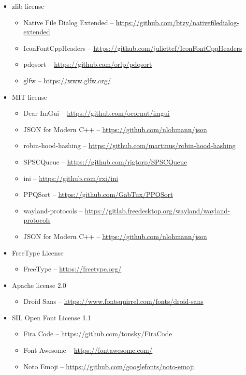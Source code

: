 \documentclass[hidelinks,titlepage,a4paper,twoside]{article}
\begin{document}
\begin{itemize}
\item zlib license
\begin{itemize}
\item Native File Dialog Extended -- \url{https://github.com/btzy/nativefiledialog-extended}
\item IconFontCppHeaders -- \url{https://github.com/juliettef/IconFontCppHeaders}
\item pdqsort -- \url{https://github.com/orlp/pdqsort}
\item glfw -- \url{https://www.glfw.org/}
\end{itemize}

\item MIT license
\begin{itemize}
\item Dear ImGui -- \url{https://github.com/ocornut/imgui}
\item JSON for Modern C++ -- \url{https://github.com/nlohmann/json}
\item robin-hood-hashing -- \url{https://github.com/martinus/robin-hood-hashing}
\item SPSCQueue \faStar{} -- \url{https://github.com/rigtorp/SPSCQueue}
\item ini -- \url{https://github.com/rxi/ini}
\item PPQSort -- \url{https://github.com/GabTux/PPQSort}
\item wayland-protocols -- \url{https://gitlab.freedesktop.org/wayland/wayland-protocols}
\item JSON for Modern C++ -- \url{https://github.com/nlohmann/json}
\end{itemize}

\item FreeType License
\begin{itemize}
\item FreeType -- \url{https://freetype.org/}
\end{itemize}

\item Apache license 2.0
\begin{itemize}
\item Droid Sans -- \url{https://www.fontsquirrel.com/fonts/droid-sans}
\end{itemize}

\item SIL Open Font License 1.1
\begin{itemize}
\item Fira Code -- \url{https://github.com/tonsky/FiraCode}
\item Font Awesome -- \url{https://fontawesome.com/}
\item Noto Emoji -- \url{https://github.com/googlefonts/noto-emoji}
\end{itemize}

\end{itemize}



\end{document}
